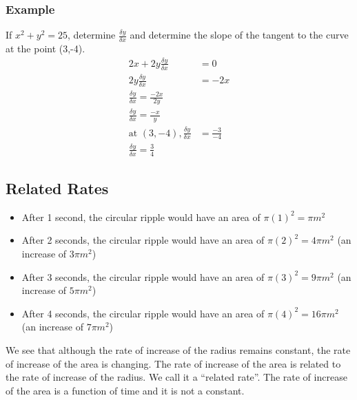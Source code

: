 \documentclass{article}
\begin{document}
\subsubsection*{Example}
If $x^2+y^2=25$, determine $\frac{\delta y}{\delta x}$ and determine the slope of the tangent to the curve at the point (3,-4).
\begin{align*}
    2x+2y \frac{\delta y}{\delta x}&=0\\
    2y \frac{\delta y}{\delta x}&=-2x\\
    \frac{\delta y}{\delta x}=\frac{-2x}{2y}\\
    \frac{\delta y}{\delta x}=\frac{-x}{y}\\
    \text{at }(3,-4), \frac{\delta y}{\delta x}&=\frac{-3}{-4}\\
    \frac{\delta y}{\delta x}=\frac{3}{4}
\end{align*}

\newpage 
\subsection{Related Rates}

\begin{itemize}
    \item After 1 second, the circular ripple would have an area of $\pi(1)^2=\pi m^2$ 
    \item After 2 seconds, the circular ripple would have an area of $\pi(2)^2=4\pi m^2$ (an increase of $3\pi m^2$)
    \item After 3 seconds, the circular ripple would have an area of $\pi(3)^2=9\pi m^2$ (an increase of $5\pi m^2$)
    \item After 4 seconds, the circular ripple would have an area of $\pi(4)^2=16\pi m^2$ (an increase of $7\pi m^2$)
\end{itemize}

We see that although the rate of increase of the radius remains constant, the rate of increase of the area is changing. The rate of increase of the area is related to the rate of increase of the radius. We call it a “related rate”. The rate of increase of the area is a function of time and it is not a constant.
\end{document}
